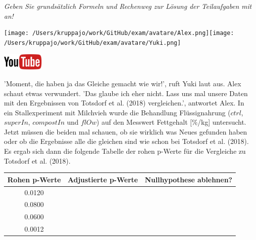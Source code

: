 \documentclass[a4paper, 9pt]{scrartcl}\usepackage[]{graphicx}\usepackage[]{xcolor}
\newenvironment{knitrout}{}{} %
\begin{document}
\textit{Geben Sie grundsätzlich Formeln und Rechenweg zur Lösung der Teilaufgaben mit an!} \\[1Ex]
 

 
\begin{minipage}[t]{0.5\textwidth}
\texttt{[image: /Users/kruppajo/work/GitHub/exam/avatare/Alex.png]}\hspace{-4mm}\texttt{[image: /Users/kruppajo/work/GitHub/exam/avatare/Yuki.png]}
\end{minipage}
\begin{minipage}[t]{0.5\textwidth}
\hfill
\href{https://youtu.be/kHmfEmU6lrk}{\includegraphics[width = 2cm]{img/youtube}}
\end{minipage}
\vspace{1ex}



'Moment, die haben ja das Gleiche gemacht wie wir!', ruft Yuki laut aus. Alex schaut etwas verwundert. 'Das glaube ich eher nicht. Lass uns mal unsere Daten mit den Ergebnissen von Totsdorf et al. (2018) vergleichen.', antwortet Alex. In ein Stallexperiment mit Milchvieh wurde die Behandlung Flüssignahrung ($ctrl$, $superIn$, $compostIn$ und $flOw$) auf den Messwert Fettgehalt [\%/kg] untersucht. Jetzt müssen die beiden mal schauen, ob sie wirklich was Neues gefunden haben oder ob die Ergebnisse alle die gleichen sind wie schon bei Totsdorf et al. (2018). Es ergab sich dann die folgende Tabelle der rohen p-Werte für die Vergleiche zu Totsdorf et al. (2018).

\begin{knitrout}
\color{fgcolor}\begin{table}[!h]
\centering\begingroup\fontsize{10}{12}\selectfont

\begin{tabular}{ccc}
\toprule
\textbf{Rohen p-Werte} & \textbf{Adjustierte p-Werte} & \textbf{Nullhypothese ablehnen?}\\
\midrule
0.0120 &  & \\
0.0800 &  & \\
0.0600 &  & \\
0.0012 &  & \\
\bottomrule
\end{tabular}
\endgroup{}
\end{table}

\end{knitrout}
\end{document}
